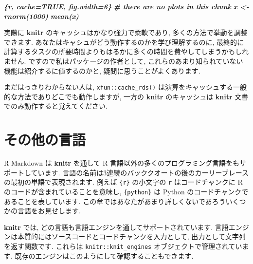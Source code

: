 \documentclass[
  11pt,
  lualatex,ja=standard,jafont=noto]{bxjsreport}
\newenvironment{Shaded}{\begin{snugshade}}{\end{snugshade}}
\newcommand{\FunctionTok}[1]{\textcolor[rgb]{0.00,0.00,0.00}{#1}}
\newcommand{\InformationTok}[1]{\textcolor[rgb]{0.56,0.35,0.01}{\textbf{\textit{#1}}}}
\newcommand{\NormalTok}[1]{#1}
\newcommand{\SpecialCharTok}[1]{\textcolor[rgb]{0.00,0.00,0.00}{#1}}
\begin{document}
\begin{Shaded}
\begin{Highlighting}[]
\InformationTok{\textasciigrave{}\textasciigrave{}\textasciigrave{}\{r, cache=TRUE, fig.width=6\}}
\InformationTok{\# there are no plots in this chunk}
\InformationTok{x \textless{}{-} rnorm(1000)}
\InformationTok{mean(x)}
\InformationTok{\textasciigrave{}\textasciigrave{}\textasciigrave{}}
\end{Highlighting}
\end{Shaded}

実際に \textbf{knitr} のキャッシュはかなり強力で柔軟であり, 多くの方法で挙動を調整できます. あなたはキャシュがどう動作するのかを学び理解するのに, 最終的に計算するタスクの所要時間よりもはるかに多くの時間を費やしてしまうかもしれません. ですので私はパッケージの作者として, これらのあまり知られていない機能は紹介するに値するのかと, 疑問に思うことがよくあります.

まだはっきりわからない人は, \texttt{xfun::cache\_rds()} は演算をキャッシュする一般的な方法でありどこでも動作しますが, 一方の \textbf{knitr} のキャッシュは \textbf{knitr} 文書でのみ動作すると覚えてください.

\hypertarget{other-languages}{%
\chapter{その他の言語}\label{other-languages}}

R Markdown は \textbf{knitr} を通して R 言語以外の多くのプログラミング言語をもサポートしています. 言語の名前は3連続のバッククオートの後のカーリーブレースの最初の単語で表現されます. 例えば \texttt{\textasciigrave{}\textasciigrave{}\textasciigrave{}\{r\}} の小文字の \texttt{r} はコードチャンクに R のコードが含まれていることを意味し, \texttt{\textasciigrave{}\textasciigrave{}\textasciigrave{}\{python\}} は Python のコードチャンクであることを表しています. この章ではあなたがあまり詳しくないであろういくつかの言語をお見せします.

\textbf{knitr} では, どの言語も言語エンジンを通してサポートされています. 言語エンジンは本質的にはソースコードとコードチャンクを入力として, 出力として文字列を返す関数です. これらは \texttt{knitr::knit\_engines} オブジェクトで管理されています. 既存のエンジンはこのようにして確認することもできます.

\begin{Shaded}
\end{Shaded}
\end{document}
